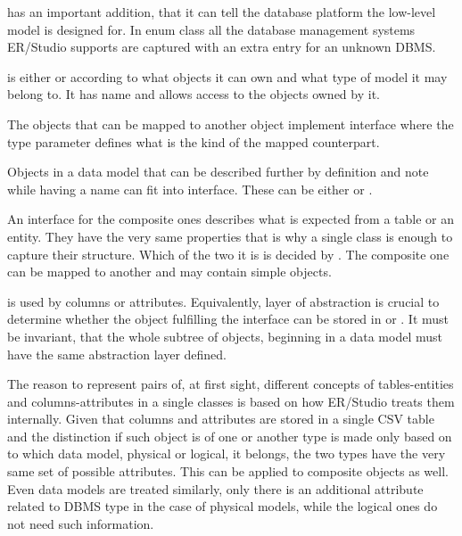  has an important addition, that it can tell the database platform the low-level model is designed for. In enum class  all the database management systems ER/Studio supports are captured with an extra entry for an unknown DBMS.

 is either  or  according to what objects it can own and what type of model it may belong to. 
It has name and allows access to the objects owned by it.

The objects that can be mapped to another object implement interface  where the type parameter defines what is the kind of the mapped counterpart.

Objects in a data model that can be described further by definition and note while having a name can fit into  interface. These can be either  or .

An interface for the composite ones describes what is expected from a table or an entity.
They have the very same properties that is why a single class is enough to capture their structure. Which of the two it is is decided by .
The composite one can be mapped to another  and may contain simple objects.

 is used by columns or attributes. Equivalently, layer of abstraction is crucial to determine whether the object fulfilling the interface can be stored in  or . It must be invariant, that the whole subtree of objects, beginning in a data model must have the same abstraction layer defined.

The reason to represent pairs of, at first sight, different concepts of tables-entities and columns-attributes in a single classes is based on how ER/Studio treats them internally. Given that columns and attributes are stored in a single CSV table and the distinction if such object is of one or another type is made only based on to which data model, physical or logical, it belongs, the two types have the very same set of possible attributes. This can be applied to composite objects as well. Even data models are treated similarly, only there is an additional attribute related to DBMS type in the case of physical models, while the logical ones do not need such information.
 
